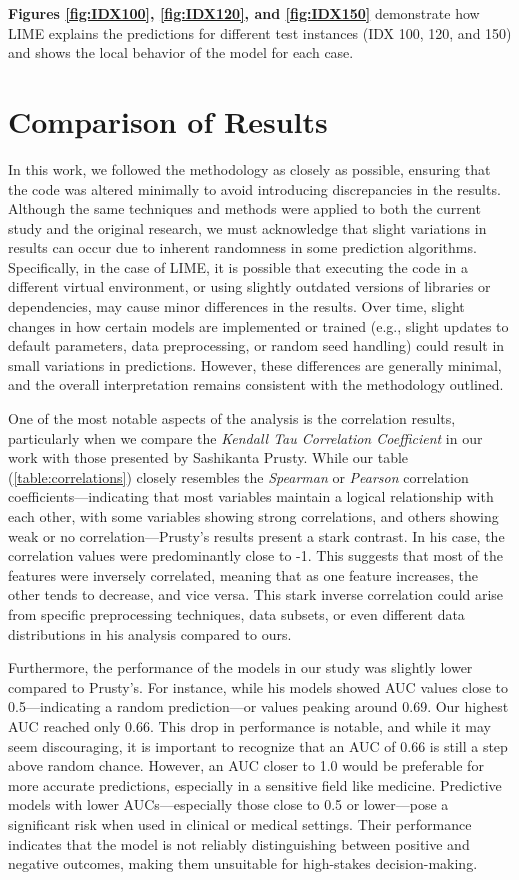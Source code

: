 \documentclass{llncs}
\begin{document}
\textbf{Figures \ref{fig:IDX100}, \ref{fig:IDX120}, and \ref{fig:IDX150}} demonstrate how LIME explains the predictions for different test instances (IDX 100, 120, and 150) and shows the local behavior of the model for each case.

\section{Comparison of Results}

In this work, we followed the methodology as closely as possible, ensuring that the code was altered minimally to avoid introducing discrepancies in the results. Although the same techniques and methods were applied to both the current study and the original research, we must acknowledge that slight variations in results can occur due to inherent randomness in some prediction algorithms. Specifically, in the case of LIME, it is possible that executing the code in a different virtual environment, or using slightly outdated versions of libraries or dependencies, may cause minor differences in the results. Over time, slight changes in how certain models are implemented or trained (e.g., slight updates to default parameters, data preprocessing, or random seed handling) could result in small variations in predictions. However, these differences are generally minimal, and the overall interpretation remains consistent with the methodology outlined.

One of the most notable aspects of the analysis is the correlation results, particularly when we compare the \textit{Kendall Tau Correlation Coefficient} in our work with those presented by Sashikanta Prusty. While our table (\ref{table:correlations}) closely resembles the \textit{Spearman} or \textit{Pearson} correlation coefficients—indicating that most variables maintain a logical relationship with each other, with some variables showing strong correlations, and others showing weak or no correlation—Prusty’s results present a stark contrast. In his case, the correlation values were predominantly close to -1. This suggests that most of the features were inversely correlated, meaning that as one feature increases, the other tends to decrease, and vice versa. This stark inverse correlation could arise from specific preprocessing techniques, data subsets, or even different data distributions in his analysis compared to ours.

Furthermore, the performance of the models in our study was slightly lower compared to Prusty’s. For instance, while his models showed AUC values close to 0.5—indicating a random prediction—or values peaking around 0.69. Our highest AUC reached only 0.66. This drop in performance is notable, and while it may seem discouraging, it is important to recognize that an AUC of 0.66 is still a step above random chance. However, an AUC closer to 1.0 would be preferable for more accurate predictions, especially in a sensitive field like medicine. Predictive models with lower AUCs—especially those close to 0.5 or lower—pose a significant risk when used in clinical or medical settings. Their performance indicates that the model is not reliably distinguishing between positive and negative outcomes, making them unsuitable for high-stakes decision-making.
\end{document}
